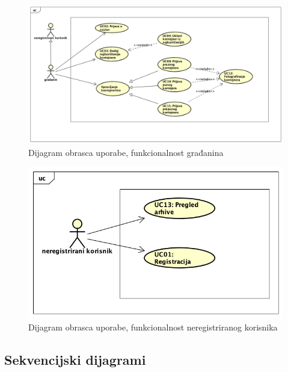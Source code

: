 				
			
				\begin{figure}[H]
					\includegraphics[scale=0.4]{figures/pravi_UC_za_gradana.PNG}
					\centering
					\caption{Dijagram obrasca uporabe, funkcionalnost građanina}
					\label{fig:ucgr-diag}
				\end{figure}
			
				

				\begin{figure}[H]
					\includegraphics[scale=0.6]{figures/pravi_UC_za_neregistriranogkorisnika.PNG}
					\centering
					\caption{Dijagram obrasca uporabe, funkcionalnost neregistriranog korisnika}
					\label{fig:ucgr-diag}
				\end{figure}
			
					
					
					
					
						\eject		
				
			\subsection{Sekvencijski dijagrami}
				
